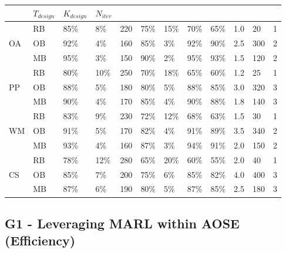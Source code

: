 \documentclass[pdflatex,sn-mathphys-num]{sn-jnl}%
\theoremstyle{thmstyleone}%
\theoremstyle{thmstyletwo}%
\theoremstyle{thmstylethree}%
\begin{document}
\begin{table}[h!]
\begin{tabular}{p{0.5cm}|p{1cm}|p{0.4cm}p{0.3cm}p{0.3cm}p{0.85cm}|p{0.4cm}p{0.4cm}p{0.55cm}|p{0.8cm}p{0.8cm}p{0.8cm}}
        
                      & $T_{design}$    & $K_{design}$ & $N_{iter}$                                                            \\
        \hline
        \multirow{3}{*}{OA}
                      & RB              & 85\%         & 8\%        & 220          & 75\% & 15\% & 70\% & 65\% & 1.0 & 20  & 1 \\
                      & OB              & 92\%         & 4\%        & 160          & 85\% & 3\%  & 92\% & 90\% & 2.5 & 300 & 2 \\
                      & MB              & 95\%         & 3\%        & 150          & 90\% & 2\%  & 95\% & 93\% & 1.5 & 120 & 2 \\
        \hline
        \multirow{3}{*}{PP}
                      & RB              & 80\%         & 10\%       & 250          & 70\% & 18\% & 65\% & 60\% & 1.2 & 25  & 1 \\
                      & OB              & 88\%         & 5\%        & 180          & 80\% & 5\%  & 88\% & 85\% & 3.0 & 320 & 3 \\
                      & MB              & 90\%         & 4\%        & 170          & 85\% & 4\%  & 90\% & 88\% & 1.8 & 140 & 3 \\
        \hline
        \multirow{3}{*}{WM}
                      & RB              & 83\%         & 9\%        & 230          & 72\% & 12\% & 68\% & 63\% & 1.5 & 30  & 1 \\
                      & OB              & 91\%         & 5\%        & 170          & 82\% & 4\%  & 91\% & 89\% & 3.5 & 340 & 2 \\
                      & MB              & 93\%         & 4\%        & 160          & 87\% & 3\%  & 94\% & 91\% & 2.0 & 150 & 2 \\
        \hline
        \multirow{3}{*}{CS}
                      & RB              & 78\%         & 12\%       & 280          & 65\% & 20\% & 60\% & 55\% & 2.0 & 40  & 1 \\
                      & OB              & 85\%         & 7\%        & 200          & 75\% & 6\%  & 85\% & 82\% & 4.0 & 400 & 3 \\
                      & MB              & 87\%         & 6\%        & 190          & 80\% & 5\%  & 87\% & 85\% & 2.5 & 180 & 3 \\
        \hline
    \end{tabular}
    \label{tab:g1_g2_g3_g4}
\end{table}

\subsection{G1 - Leveraging MARL within AOSE (Efficiency)}
\end{document}

